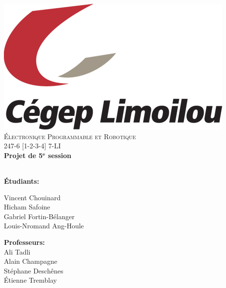 \documentclass[10pt,a4paper,final]{article}
\begin{document}
\renewcommand\headrulewidth{0pt}
\fancyfoot[C]{ }






\begin{center}
\includegraphics[scale=1]{Figures/School_Logo.jpg}~\\[1cm]  
\textsc{\LARGE \'{E}lectronique Programmable et Robotique}\\[1.5cm]
\Large 247-6 [1-2-3-4] 7-LI\\[0.5cm]
{ \huge \bfseries Projet de 5$\mathbf{^{e}}$ session \\[0.4cm] }
\HRule \\[1.5cm]





\begin{multicols}{2}
\begin{flushleft}



\textbf{Étudiants:}\\

\bigskip

Vincent Chouinard\\
Hicham Safoine\\
Gabriel Fortin-Bélanger\\ 
Louis-Nromand Ang-Houle\\




\end{flushleft}
\vfill
\begin{flushright}

\textbf{Professeurs:}\\
\medskip
Ali Tadli\\
Alain Champagne\\
Stéphane Deschênes\\
Étienne Tremblay\\




\end{flushright}
\end{multicols}
\end{center}
\end{document}
